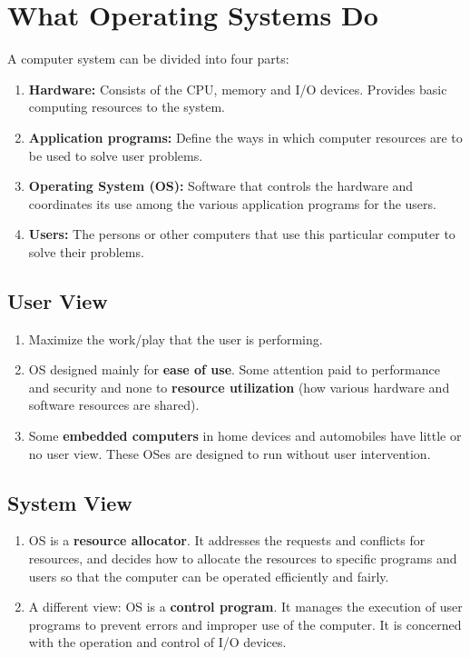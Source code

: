 \documentclass[journal,12pt,twocolumn]{IEEEtran}
\begin{document}
\section{What Operating Systems Do}

A computer system can be divided into four parts:
\begin{enumerate}
    \item \textbf{Hardware:} Consists of the CPU, memory and I/O devices. 
    Provides basic computing resources to the system.
    \item \textbf{Application programs:} Define the ways in which computer 
    resources are to be used to solve user problems.
    \item \textbf{Operating System (OS):} Software that controls the hardware 
    and coordinates its use among the various application programs for the 
    users.
    \item \textbf{Users:} The persons or other computers that use this 
    particular computer to solve their problems.
\end{enumerate}

\subsection{User View}
\begin{enumerate}
    \item Maximize the work/play that the user is performing.
    \item OS designed mainly for \textbf{ease of use}. Some attention paid to 
    performance and security and none to \textbf{resource utilization} (how 
    various hardware and software resources are shared).
    \item Some \textbf{embedded computers} in home devices and automobiles have 
    little or no user view. These OSes are designed to run without user 
    intervention.
\end{enumerate}

\subsection{System View}
\begin{enumerate}
    \item OS is a \textbf{resource allocator}. It addresses the requests and 
    conflicts for resources, and decides how to allocate the resources to 
    specific programs and users so that the computer can be operated 
    efficiently and fairly.
    \item A different view: OS is a \textbf{control program}. It manages the
    execution of user programs to prevent errors and improper use of the 
    computer. It is concerned with the operation and control of I/O devices.
\end{enumerate}
\end{document}
